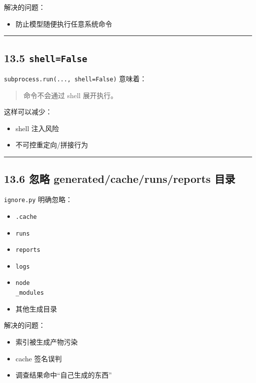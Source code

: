 \documentclass[UTF8,12pt,openany]{ctexbook}
\begin{document}
解决的问题：\par

\begin{itemize}
\item 防止模型随便执行任意系统命令
\end{itemize}

\hrule

\subsection{13.5 \texttt{shell=False}}

\texttt{subprocess.run(..., shell=False)} 意味着：\par

\begin{quote}
命令不会通过 shell 展开执行。
\end{quote}

这样可以减少：\par

\begin{itemize}
\item shell 注入风险
\item 不可控重定向/拼接行为
\end{itemize}

\hrule

\subsection{13.6 忽略 generated/cache/runs/reports 目录}

\texttt{ignore.py} 明确忽略：\par

\begin{itemize}
\item \texttt{.cache}
\item \texttt{runs}
\item \texttt{reports}
\item \texttt{logs}
\item \texttt{node\\_modules}
\item 其他生成目录
\end{itemize}

解决的问题：\par

\begin{itemize}
\item 索引被生成产物污染
\item cache 签名误判
\item 调查结果命中“自己生成的东西”
\end{itemize}
\end{document}
